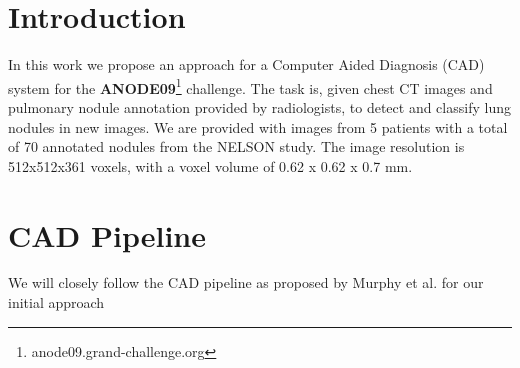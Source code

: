 \documentclass[a4paper, 10pt, english, onecolumn]{article}
\title{\fontfamily{phv}\selectfont{Lung Nodule CAD System Proposal}}
\author{
  \textbf{W. Kanters} - \href{mailto:kantersw@gmail.com}{kantersw@gmail.com} \\
  \textbf{T. de Ruijter} - \href{mailto:t.deruijter@student.ru.nl}{t.deruijter@student.ru.nl}\\
}
\date{\fontfamily{ptm}\selectfont{\small{\bfseries{\today - Radboud
Universiteit Nijmegen}}}\\[0.5cm]\rule{\linewidth}{0.3mm}}
\begin{document}
\maketitle

\setlength{\parindent}{0.0cm}
\setlength{\parskip}{0.25cm}

\section{Introduction}
In this work we propose an approach for a Computer Aided Diagnosis (CAD) system for the \textbf{ANODE09}\footnote{anode09.grand-challenge.org} challenge.
The task is, given chest CT images and pulmonary nodule annotation provided by radiologists, to detect and classify lung nodules in new images.
We are provided with images from 5 patients with a total of 70 annotated nodules from the NELSON study.
The image resolution is 512x512x361 voxels, with a voxel volume of 0.62 x 0.62 x 0.7 mm.

\section{CAD Pipeline}
We will closely follow the CAD pipeline as proposed by Murphy et al. \cite{murphy2009large} for our initial approach
\end{document}
